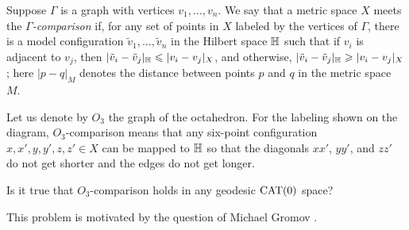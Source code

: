 Suppose $\Gamma$ is a graph with vertices $v_1,\dots,v_n$.
We say that a metric space $X$ meets the \emph{$\Gamma$-comparison} if, for any set of points in $X$ labeled by the vertices of $\Gamma$, there is a model configuration $\tilde v_1,\dots,\tilde v_n$ in the Hilbert space $\mathbb{H}$ such that
if $v_i$ is adjacent to $v_j$, then
$|\tilde v_i-\tilde v_j|_{\HH}\z\le | v_i-v_j|_{X}$,
and otherwise,
$|\tilde v_i-\tilde v_j|_{\mathbb{H}}\geqslant | v_i-v_j|_{X}$;
here $|p-q|_M$ denotes the distance between points $p$ and $q$ in the metric space~$M$.


{

\begin{figure}
\vskip-6mm\centering
{}
\end{figure}

Let us denote by $O_3$ the graph of the octahedron.
For the labeling shown on the diagram, $O_3$-comparison means that any six-point configuration $x,x',y,y',z,z'\in X$ can be mapped to $\mathbb{H}$ so that the diagonals $xx'$, $yy'$, and $zz'$ do not get shorter and the edges do not get longer.

}

\begin{pr}
Is it true that $O_3$-comparison holds in any geodesic $\operatorname{\rm CAT}\nolimits(0)$ space?
\end{pr}



This problem is motivated by the question of Michael Gromov \cite[1.19$_+(e)$]{gromov-MetStr}.

